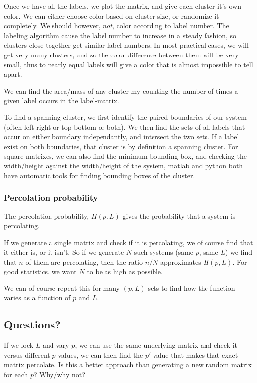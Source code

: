\documentclass[a4paper, 11pt, notitlepage, english]{article}
\begin{document}
Once we have all the labels, we plot the matrix, and give each cluster it's own color. We can either choose color based on cluster-size, or randomize it completely. We should however, \emph{not}, color according to label number. The labeling algorithm cause the label number to increase in a steady fashion, so clusters close together get similar label numbers. In most practical cases, we will get very many clusters, and so the color difference between them will be very small, thus to nearly equal labels will give a color that is almost impossible to tell apart.

We can find the area/mass of any cluster my counting the number of times a given label occurs in the label-matrix.

To find a spanning cluster, we first identify the paired boundaries of our system (often left-right or top-bottom or both). We then find the sets of all labels that occur on either boundary independantly, and intersect the two sets. If a label exist on both boundaries, that cluster is by definition a spanning cluster. For square matrixes, we can also find the minimum bounding box, and checking the width/height against the width/height of the system, matlab and python both have automatic tools for finding bounding boxes of the cluster.

\subsubsection*{Percolation probability}

The percolation probability, $\Pi(p,L)$ gives the probability that a system is percolating. 

If we generate a single matrix and check if it is percolating, we of course find that it either is, or it isn't. So if we generate $N$ such systems (same $p$, same $L$) we find that $n$ of them are percolating, then the ratio $n/N$ approximates $\Pi(p,L)$. For good statistics, we want $N$ to be as high as possible. 

We can of course repeat this for many $(p, L)$ sets to find how the function varies as a function of $p$ and $L$.

\subsection*{Questions?}

If we lock $L$ and vary $p$, we can use the same underlying matrix and check it versus different $p$ values, we can then find the $p'$ value that makes that exact matrix percolate. Is this a better approach than generating a new random matrix for each $p$? Why/why not? 
\end{document}
